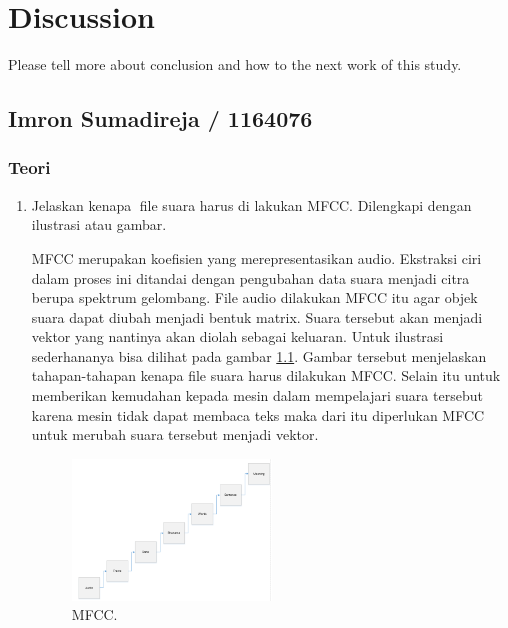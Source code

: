 \chapter{Discussion}
Please tell more about conclusion and how to the next work of this study.

\section{Imron Sumadireja / 1164076}
\subsection{Teori}
\begin{enumerate}

\item Jelaskan kenapa file suara harus di lakukan MFCC. Dilengkapi dengan ilustrasi atau gambar. \par
MFCC merupakan koefisien yang merepresentasikan audio. Ekstraksi ciri dalam proses ini ditandai dengan pengubahan data suara menjadi citra berupa spektrum gelombang. File audio dilakukan MFCC itu agar objek suara dapat diubah menjadi bentuk matrix. Suara tersebut akan menjadi vektor yang nantinya akan diolah sebagai keluaran. Untuk ilustrasi sederhananya bisa dilihat pada gambar \ref{cc1}. Gambar tersebut menjelaskan tahapan-tahapan kenapa file suara harus dilakukan MFCC. Selain itu untuk memberikan kemudahan kepada mesin dalam mempelajari suara tersebut karena mesin tidak dapat membaca teks maka dari itu diperlukan MFCC untuk merubah suara tersebut menjadi vektor.
		\begin{figure}[!htbp]
		\centerline{\includegraphics[width=0.5\textwidth]{figures/im/cc1.png}}
		\caption{MFCC.}
		\label{cc1}
		\end{figure}


\end{enumerate}
